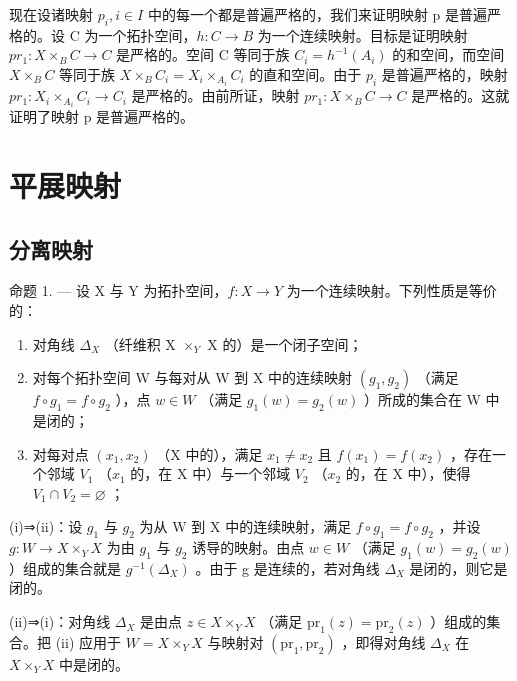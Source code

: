 现在设诸映射 \(p_{i}, i \in I\) 中的每一个都是普遍严格的，我们来证明映射 p 是普遍严格的。设 C 为一个拓扑空间，\(h: C \to B\) 为一个连续映射。目标是证明映射 \(pr_{1}: X \times_{B} C \to C\) 是严格的。空间 C 等同于族 \(C_{i} = h^{-1}(A_{i})\) 的和空间，而空间 \(X \times_{B} C\) 等同于族 \(X \times_{B} C_{i} = X_{i} \times_{A_{i}} C_{i}\) 的直和空间。由于 \(p_{i}\) 是普遍严格的，映射 \(pr_{1}: X_{i} \times_{A_{i}} C_{i} \to C_{i}\) 是严格的。由前所证，映射 \(pr_{1}: X \times_{B} C \to C\) 是严格的。这就证明了映射 p 是普遍严格的。

\section{平展映射}

\subsection{分离映射}

命题 1. --- 设 X 与 Y 为拓扑空间，\(f\colon X \to Y\) 为一个连续映射。下列性质是等价的：

\begin{enumerate}
\def\labelenumi{(\roman{enumi})}
\item
  对角线 \(\Delta_{X}\) （纤维积 X \(\times_{Y}\) X 的）是一个闭子空间；
\item
  对每个拓扑空间 W 与每对从 W 到 X 中的连续映射 \((g_{1}, g_{2})\) （满足 \(f \circ g_{1} = f \circ g_{2}\) ），点 \(w \in W\) （满足 \(g_{1}(w) = g_{2}(w)\) ）所成的集合在 W 中是闭的；
\item
  对每对点 \((x_{1}, x_{2})\) （X 中的），满足 \(x_{1} \neq x_{2}\) 且 \(f(x_{1}) = f(x_{2})\) ，存在一个邻域 \(V_{1}\) （\(x_{1}\) 的，在 X 中）与一个邻域 \(V_{2}\) （\(x_{2}\) 的，在 X 中），使得 \(V_{1} \cap V_{2} = \varnothing\) ；
\end{enumerate}

(i)⇒(ii)：设 \(g_{1}\) 与 \(g_{2}\) 为从 W 到 X 中的连续映射，满足 \(f \circ g_{1} = f \circ g_{2}\) ，并设 \(g: W \to X \times_{Y} X\) 为由 \(g_{1}\) 与 \(g_{2}\) 诱导的映射。由点 \(w \in W\) （满足 \(g_{1}(w) = g_{2}(w)\) ）组成的集合就是 \(g^{-1}(\Delta_{X})\) 。由于 g 是连续的，若对角线 \(\Delta_{X}\) 是闭的，则它是闭的。

(ii)⇒(i)：对角线 \(\Delta_{X}\) 是由点 \(z \in X \times_{Y} X\) （满足 \(\mathrm{pr}_{1}(z) = \mathrm{pr}_{2}(z)\) ）组成的集合。把 (ii) 应用于 \(W = X \times_{Y} X\) 与映射对 \((\mathrm{pr}_{1}, \mathrm{pr}_{2})\) ，即得对角线 \(\Delta_{X}\) 在 \(X \times_{Y} X\) 中是闭的。

